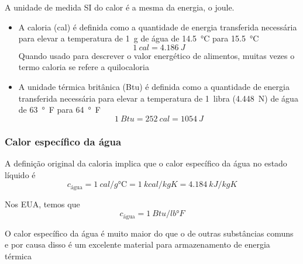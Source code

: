 \documentclass[t,%
brazilian,%
11pt,%
aspectratio=169,%
table%
]{beamer}
\begin{document}
\begin{frame}
    A unidade de medida SI do calor é a mesma da energia, o joule.
    \begin{itemize}
        \item A caloria (cal) é definida como a quantidade de energia
            transferida necessária para elevar a temperatura de \SI{1}{g} de
            água de \SI{14.5}{\celsius} para \SI{15,5}{\celsius}
            \[
                \SI{1}{cal} = \SI{4,186}{J}
            \]
            Quando usado para descrever o valor energético de alimentos, muitas
            vezes o termo caloria se refere a quilocaloria

        \item A unidade térmica britânica (Btu) é definida como a quantidade de
            energia transferida necessária para elevar a temperatura de
            \SI{1}{libra} (\SI{4,448}{N}) de água de \SI{63}{\degree F} para
            \SI{64}{\degree F}
            \[
                \SI{1}{Btu} = \SI{252}{cal} = \SI{1054}{J}
            \]
    \end{itemize} 
\end{frame}

\begin{frame}[c]
    \frametitle{Calor específico da água}
    A definição original da caloria implica que o calor específico da água no estado líquido é
    \[
        c_{\text{água}} = \SI{1}{cal/g \celsius} = \SI{1}{kcal/kg  K} = 
        \SI{4,184}{kJ/kg K}
    \]

    Nos EUA, temos que
    \[
        c_{\text{água}} = \SI{1}{Btu/lb\degree F}
    \]

    O calor específico da água é muito maior do que o de outras substâncias
    comuns e por causa disso é um excelente material para armazenamento de
    energia térmica
\end{frame}
\end{document}
